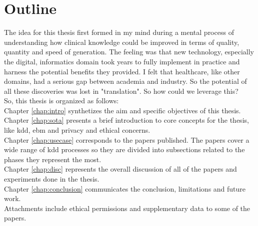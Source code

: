 \chapter*{Outline}


\doublespacing
The idea for this thesis first formed in my mind during a mental process of understanding how clinical knowledge could be improved in terms of quality, quantity and speed of generation. The feeling was that new technology, especially the digital, informatics domain took years to fully implement in practice and harness the potential benefits they provided. I felt that healthcare, like other domains, had a serious gap between academia and industry. So the potential of all these discoveries was lost in "translation".
So how could we leverage this? \\
So, this thesis is organized as follows:\\
Chapter \ref{chap:intro} synthetizes the aim and specific objectives of this thesis.
Chapter \ref{chap:sota} presents a brief introduction to core concepts for the thesis, like \ac{kdd}, \ac{ebm} and privacy and ethical concerns.\\
Chapter \ref{chap:usecase} corresponds to the papers published. The papers cover a wide range of \ac{kdd} processes so they are divided into subsections related to the phases they represent the most.\\

Chapter \ref{chap:disc} represents the overall discussion of all of the papers and experiments done in the thesis.\\

Chapter \ref{chap:conclusion} communicates the conclusion, limitations and future work.\\

Attachments include ethical permissions and supplementary data to some of the papers.
